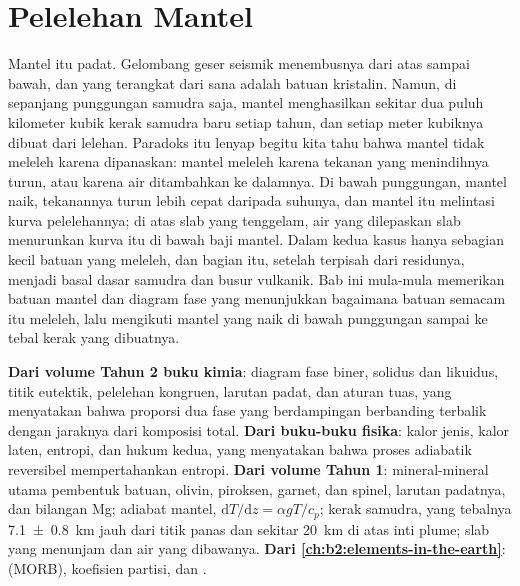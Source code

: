 \chapter{Pelelehan Mantel}\label{ch:b2:mantle-melting}

Mantel itu padat. Gelombang geser seismik menembusnya dari atas sampai bawah, dan
 yang terangkat dari sana adalah batuan kristalin. Namun, di sepanjang punggungan samudra
saja, mantel menghasilkan sekitar dua puluh kilometer kubik kerak samudra baru setiap tahun,
dan setiap meter kubiknya dibuat dari lelehan. Paradoks itu lenyap begitu kita tahu
bahwa mantel tidak meleleh karena dipanaskan: mantel meleleh karena
tekanan yang menindihnya turun, atau karena air ditambahkan ke dalamnya. Di bawah punggungan,
mantel naik, tekanannya turun lebih cepat daripada suhunya, dan mantel itu melintasi
kurva pelelehannya; di atas slab yang tenggelam, air yang dilepaskan slab menurunkan kurva itu
di bawah baji mantel. Dalam kedua kasus hanya sebagian kecil batuan yang
meleleh, dan bagian itu, setelah terpisah dari residunya, menjadi basal
dasar samudra dan busur vulkanik. Bab ini mula-mula memerikan batuan
mantel dan diagram fase yang menunjukkan bagaimana batuan semacam itu meleleh, lalu mengikuti
mantel yang naik di bawah punggungan sampai ke tebal kerak yang dibuatnya.

\begin{recall}
\textbf{Dari volume Tahun 2 buku kimia}: diagram fase biner,
solidus dan likuidus, titik eutektik, pelelehan kongruen, larutan padat,
dan aturan tuas, yang menyatakan bahwa proporsi dua fase yang berdampingan
berbanding terbalik dengan jaraknya dari komposisi total.
\textbf{Dari buku-buku fisika}: kalor jenis, kalor laten, entropi,
dan hukum kedua, yang menyatakan bahwa proses adiabatik reversibel mempertahankan entropi.
\textbf{Dari volume Tahun 1}: mineral-mineral utama pembentuk batuan, olivin,
piroksen, garnet, dan spinel, larutan padatnya, dan bilangan Mg;
adiabat mantel, $\mathrm dT/\mathrm dz = \alpha gT/c_p$; kerak samudra, yang tebalnya
\qty[uncertainty-mode=separate]{7.1 \pm 0.8}{km} jauh dari titik panas dan
sekitar \qty{20}{km} di atas inti plume; slab yang menunjam dan air yang
dibawanya. \textbf{Dari \cref{ch:b2:elements-in-the-earth}}: 
(MORB), koefisien partisi, dan .
\end{recall}

